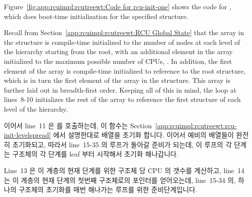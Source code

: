 Figure~\ref{fig:app:rcuimpl:rcutreewt:Code for rcu-init-one}
shows the code for , which does boot-time initialization
for the specified
 structure.

Recall from
Section~\ref{app:rcuimpl:rcutreewt:RCU Global State}
that the  array in the  structure
is compile-time initialized to the number of nodes at each level of
the hierarchy starting from the root,
with an additional element in the array initialized
to the maximum possible number of CPUs, .
In addition, the first element of the  array is compile-time
initialized to reference to the root  structure, which is
in turn
the first element of the  array in the  structure.
This array is further laid out in breadth-first order.
Keeping all of this in mind, the loop at lines~8-10 initializes the rest
of the  array to reference the first  structure
of each level of the  hierarchy.
\fi

이어서 line~11 은  를 호출하는데, 이 함수는
Section~\ref{app:rcuimpl:rcutreewt:rcu-init-levelspread}
에서 설명한대로  배열을 초기화 합니다.
이어서 예비의 배열들이 완전히 초기화되고, 따라서 line~15-35 의 루프가 돌아갈
준비가 되는데, 이 루프의 각 단계는  구조체의 각 단계를 leaf 부터
시작해서 초기화 해나갑니다.

Line~13 은 이 계층의 현재 단계를 위한  구조체 당 CPU 의 갯수를
계산하고, line~14 는 이 계층의 현재 단계의 첫번째  구조체로의
포인터를 얻어오는데, line~15-34 의, 하나의  구조체의 초기화를 매번
해나가는 루프를 위한 준비단계입니다.
\iffalse

Line~11 then invokes \co{rcu_init_levelspread()}, which fills in the
\co{->levelspread[]} array, as was described in
Section~\ref{app:rcuimpl:rcutreewt:rcu-init-levelspread}.
The auxiliary arrays are then fully initialized, and thus ready for
the loop from lines~15-35, each pass through which initializes
one level of the \co{rcu_node} hierarchy, starting from the leaves.

Line~13 computes the number of CPUs per \co{rcu_node} structure for
the current level of the hierarchy, and line~14 obtains a pointer
to the first \co{rcu_node} structure on the current level of the
hierarchy, in preparation for the loop from lines~15-34, each pass
through which initializes one \co{rcu_node} structure.
\fi

